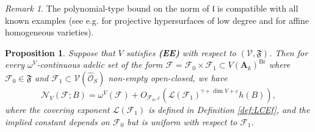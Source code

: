 \documentclass[11pt,letterpaper]{amsart}
\newcommand{\CF}{{\mathcal {F}}}
\newcommand{\CL}{{\mathcal {L}}}
\newcommand{\CN}{{\mathcal {N}}}
\newcommand{\CO}{{\mathcal {O}}}
\newcommand{\CV}{{\mathcal {V}}}
\newcommand{\RA}{{\mathbf {A}}}
\theoremstyle{plain}
\numberwithin{equation}{section}
\newtheorem{proposition}[theorem]{Proposition}
\theoremstyle{definition}
\theoremstyle{remark}
\newtheorem{remark}[theorem]{Remark}
\begin{document}
\begin{remark}
	The polynomial-type bound on the norm of $\mathfrak{l}$ is compatible with all known examples (see e.g. \cite{Birch} for projective hypersurfaces of low degree and \cite[Theorem 3.1]{Cao-Huang2} for affine homogeneous varieties).
\end{remark}
\begin{proposition}\label{prop:EEimpliesgeneral}
	Suppose that $V$ satisfies \textbf{(EE)} with respect to $(\CV,\mathfrak{F})$. Then 
	for every $\omega^V$-continuous adelic set of the form $\CF=\CF_0\times\CF_1\subset V(\RA_k)^{\operatorname{Br}}$ where  $\CF_0\in\mathfrak{F}$ and  $\CF_1\subset \CV(\widehat{\CO}_S)$ non-empty open-closed, we have
	$$\CN_V(\CF;B)=\omega^V(\CF)+O_{\CF_0,\varepsilon}(\CL(\CF_1)^{\gamma+\dim V+\varepsilon} h(B)),$$ where the covering exponent $\CL(\CF_1)$ is defined in Definition \ref{def:LCEf}, and the implied constant depends on $\CF_0$ but is uniform with respect to $\CF_1$. 
\end{proposition}
\end{document}
